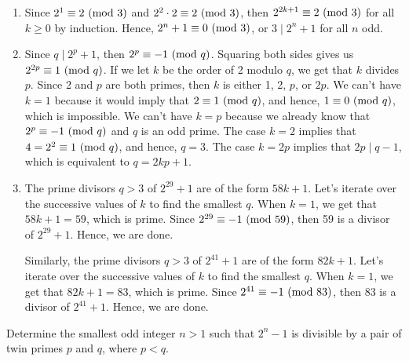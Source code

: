 \begin{solution}
    \begin{enumerate}
        \item Since $2^1 \equiv 2 \ (\mathrm{mod}\ 3)$ and $2^2 \cdot 2 \equiv 2 \ (\mathrm{mod}\ 3)$, then $2^{2k+1} \equiv 2 \ (\mathrm{mod}\ 3)$ for all $k \geq 0$ by induction. Hence, $2^n + 1 \equiv 0 \ (\mathrm{mod}\ 3)$, or $3 \mid 2^n + 1$ for all $n$ odd.
        \item Since $q \mid 2^p + 1$, then $2^p \equiv -1 \ (\mathrm{mod}\ q)$. Squaring both sides gives us $2^{2p} \equiv 1 \ (\mathrm{mod}\ q)$. If we let $k$ be the order of 2 modulo $q$, we get that $k$ divides $p$. Since 2 and $p$ are both primes, then $k$ is either 1, 2, $p$, or $2p$. We can't have $k = 1$ because it would imply that $2 \equiv 1 \ (\mathrm{mod}\ q)$, and hence, $1 \equiv 0 \ (\mathrm{mod}\ q)$, which is impossible. We can't have $k = p$ because we already know that $2^p \equiv -1 \ (\mathrm{mod}\ q)$ and $q$ is an odd prime. The case $k = 2$ implies that $4 = 2^2 \equiv 1 \ (\mathrm{mod}\ q)$, and hence, $q = 3$. The case $k = 2p$ implies that $2p \mid q- 1$, which is equivalent to $q= 2kp + 1$. 
        \item The prime divisors $q > 3$ of $2^{29} + 1$ are of the form $58k + 1$. Let's iterate over the successive values of $k$ to find the smallest $q$. When $k = 1$, we get that $58k + 1 = 59$, which is prime. Since $2^{29} \equiv -1 \ (\mathrm{mod}\ 59)$, then 59 is a divisor of $2^{29} + 1$. Hence, we are done. 
        
        Similarly, the prime divisors $q > 3$ of $2^{41} + 1$ are of the form $82k + 1$. Let's iterate over the successive values of $k$ to find the smallest $q$. When $k = 1$, we get that $82k + 1 = 83$, which is prime. Since $2^{41} \equiv -1 \ (\mathrm{mod}\ 83)$, then 83 is a divisor of $2^{41} + 1$. Hence, we are done. \\
    \end{enumerate}
\end{solution}

\begin{exercise}
    Determine the smallest odd integer $n > 1$ such that $2^n - 1$ is divisible by a pair of twin primes $p$ and $q$, where $p < q$. \\
\end{exercise}

